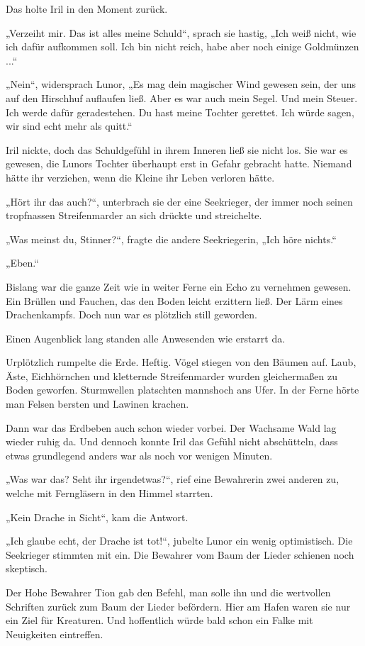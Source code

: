 Das holte Iril in den Moment zurück.

„Verzeiht mir. Das ist alles meine Schuld“, sprach sie hastig, „Ich weiß nicht, wie ich dafür aufkommen soll. Ich bin nicht reich, habe aber noch einige Goldmünzen ...“

„Nein“, widersprach Lunor, „Es mag dein magischer Wind gewesen sein, der uns auf den Hirschhuf auflaufen ließ. Aber es war auch mein Segel. Und mein Steuer. Ich werde dafür geradestehen. Du hast meine Tochter gerettet. Ich würde sagen, wir sind echt mehr als quitt.“

Iril nickte, doch das Schuldgefühl in ihrem Inneren ließ sie nicht los. Sie war es gewesen, die Lunors Tochter überhaupt erst in Gefahr gebracht hatte. Niemand hätte ihr verziehen, wenn die Kleine ihr Leben verloren hätte.

„Hört ihr das auch?“, unterbrach sie der eine Seekrieger, der immer noch seinen tropfnassen Streifenmarder an sich drückte und streichelte.

„Was meinst du, Stinner?“, fragte die andere Seekriegerin, „Ich höre nichts.“

„Eben.“

Bislang war die ganze Zeit wie in weiter Ferne ein Echo zu vernehmen gewesen. Ein Brüllen und Fauchen, das den Boden leicht erzittern ließ. Der Lärm eines Drachenkampfs. Doch nun war es plötzlich still geworden.

Einen Augenblick lang standen alle Anwesenden wie erstarrt da.

Urplötzlich rumpelte die Erde. Heftig. Vögel stiegen von den Bäumen auf. Laub, Äste, Eichhörnchen und kletternde Streifenmarder wurden gleichermaßen zu Boden geworfen. Sturmwellen platschten mannshoch ans Ufer. In der Ferne hörte man Felsen bersten und Lawinen krachen.

Dann war das Erdbeben auch schon wieder vorbei. Der Wachsame Wald lag wieder ruhig da. Und dennoch konnte Iril das Gefühl nicht abschütteln, dass etwas grundlegend anders war als noch vor wenigen Minuten.

„Was war das? Seht ihr irgendetwas?“, rief eine Bewahrerin zwei anderen zu, welche mit Ferngläsern in den Himmel starrten.

„Kein Drache in Sicht“, kam die Antwort.

„Ich glaube echt, der Drache ist tot!“, jubelte Lunor ein wenig optimistisch. Die Seekrieger stimmten mit ein. Die Bewahrer vom Baum der Lieder schienen noch skeptisch.

Der Hohe Bewahrer Tion gab den Befehl, man solle ihn und die wertvollen Schriften zurück zum Baum der Lieder befördern. Hier am Hafen waren sie nur ein Ziel für Kreaturen. Und hoffentlich würde bald schon ein Falke mit Neuigkeiten eintreffen.

